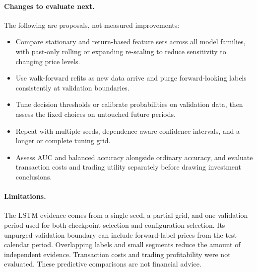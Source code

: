 \paragraph{Changes to evaluate next.}
The following are proposals, not measured improvements:
\begin{itemize}
    \item Compare stationary and return-based feature sets across all model families, with past-only rolling or expanding re-scaling to reduce sensitivity to changing price levels.
    \item Use walk-forward refits as new data arrive and purge forward-looking labels consistently at validation boundaries.
    \item Tune decision thresholds or calibrate probabilities on validation data, then assess the fixed choices on untouched future periods.
    \item Repeat with multiple seeds, dependence-aware confidence intervals, and a longer or complete tuning grid.
    \item Assess AUC and balanced accuracy alongside ordinary accuracy, and evaluate transaction costs and trading utility separately before drawing investment conclusions.
\end{itemize}

\paragraph{Limitations.}
The LSTM evidence comes from a single seed, a partial grid, and one validation period used for both checkpoint selection and configuration selection. Its unpurged validation boundary can include forward-label prices from the test calendar period. Overlapping labels and small segments reduce the amount of independent evidence. Transaction costs and trading profitability were not evaluated. These predictive comparisons are not financial advice.
